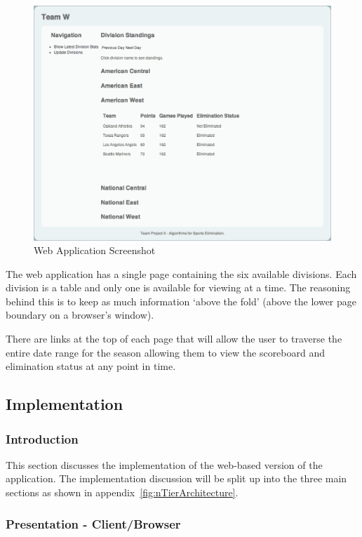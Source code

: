 \begin{figure}
\includegraphics[width=\linewidth,keepaspectratio]
{images/webAppScreenshot.png}
\caption{Web Application Screenshot}
\label{fig:webAppScreenshot}
\end{figure}

The web application has a single page containing the six available divisions.
Each division is a table and only one is available for viewing at a time. The 
reasoning behind this is to keep as much information `above the fold' (above the
lower page boundary on a browser's window).

There are links at the top of each page that will allow the user to traverse
the entire date range for the season allowing them to view the scoreboard and
elimination status at any point in time.

\subsection{Implementation}

\subsubsection{Introduction}

This section discusses the implementation of the web-based version of the
application. The implementation discussion will be split up into the three
main sections as shown in appendix~\ref{fig:nTierArchitecture}.

\subsubsection{Presentation - Client/Browser}

